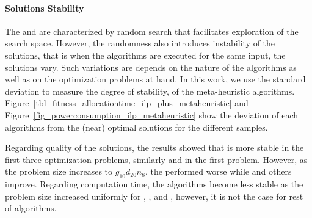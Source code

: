 \paragraph{Solutions Stability} The \pso{} and \de{} are characterized by random search that facilitates exploration of the search space. However, the randomness also introduces instability of the solutions, that is when the algorithms are executed for the same input, the solutions vary. Such variations are depends on the nature of the algorithms as well as on the optimization problems at hand. In this work, we use  the standard deviation to measure the degree of stability, of the meta-heuristic algorithms. Figure~\ref{tbl_fitness_allocationtime_ilp_plus_metaheuristic} and Figure~\ref{fig_powerconsumption_ilp_metaheuristic} show the deviation of each algorithms from the (near) optimal solutions for the different samples.

Regarding quality of the solutions, the results showed that \hcpso{} is more stable in the first three optimization problems, similarly \de{} and \lpso{} in the first problem. However, as the problem size increases to $g_{10}d_{20}n_8$, the \hcpso{} performed worse while \pso{} and others improve. Regarding computation time, the algorithms become less stable as the problem size increased uniformly for \pso, \de, \hcpso{} and \shpso, however, it is not the case for rest of algorithms.

